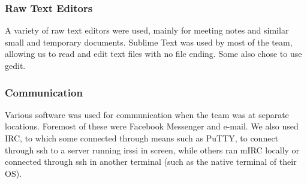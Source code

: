 \subsubsection{Raw Text Editors}
A variety of raw text editors were used, mainly for meeting notes and similar small and temporary documents. Sublime Text was used by most of the team, allowing us to read and edit text files with no file ending. Some also chose to use gedit.

\subsubsection{Communication}
Various software was used for communication when the team was at separate locations. Foremost of these were Facebook Messenger and e-mail. We also used IRC, to which some connected through means such as PuTTY, to connect through ssh to a server running irssi in screen, while others ran mIRC locally or connected through ssh in another terminal (such as the native terminal of their OS).

